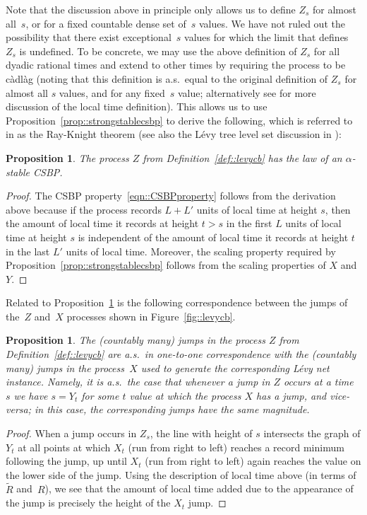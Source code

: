 \documentclass[10pt]{amsart}
\theoremstyle{plain}
\numberwithin{theorem}{section}
\newtheorem{proposition}[theorem]{Proposition}
\theoremstyle{definition}
\newcommand{\cadlag}{càdlàg}
\let\wt\widetilde
\begin{document}
Note that the discussion above in principle only allows us to define $Z_s$ for almost all~$s$, or for a fixed countable dense set of~$s$ values. We have not ruled out the possibility that there exist exceptional~$s$ values for which the limit that defines $Z_s$ is undefined. To be concrete, we may use the above definition of $Z_s$ for all dyadic rational times and extend to other times by requiring the process to be {\cadlag} (noting that this definition is a.s.\ equal to the original definition of $Z_s$ for almost all $s$ values, and for any fixed~$s$ value; alternatively see \cite{duquesnelegall2005levytrees} for more discussion of the local time definition). This allows us to use Proposition~\ref{prop::strongstablecsbp} to derive the following, which is referred to in \cite[Th.\,1.4.1]{duquesnelegall2005levytrees} as the Ray-Knight theorem (see also the Lévy tree level set discussion in \cite{dlg2002trees_levy, duquesnelegall2005levytrees}):

\begin{proposition}
\label{prop::Zisalphastable}
The process $Z$ from Definition~\ref{def::levycb} has the law of an $\alpha$-stable CSBP.
\end{proposition}
\begin{proof}
The CSBP property~\eqref{eqn::CSBPproperty} follows from the derivation above because if the process records $L+L'$ units of local time at height $s$, then the amount of local time it records at height $t > s$ in the first $L$ units of local time at height $s$ is independent of the amount of local time it records at height $t$ in the last $L'$ units of local time. Moreover, the scaling property required by Proposition~\ref{prop::strongstablecsbp} follows from the scaling properties of $X$ and $Y$.
\end{proof}

Related to Proposition~\ref{prop::Zisalphastable} is the following correspondence between the jumps of the~$Z$ and~$X$ processes shown in Figure~\ref{fig::levycb}.

\begin{proposition}
\label{prop::jump_correspondence}
The (countably many) jumps in the process $Z$ from Definition~\ref{def::levycb} are a.s.\ in one-to-one correspondence with the (countably many) jumps in the process~$X$ used to generate the corresponding Lévy net instance. Namely, it is a.s.\ the case that whenever a jump in $Z$ occurs at a time $s$ we have $s = Y_t$ for some $t$ value at which the process $X$ has a jump, and vice-versa; in this case, the corresponding jumps have the same magnitude.
\end{proposition}
\begin{proof}
When a jump occurs in $Z_s$, the line with height of $s$ intersects the graph of $Y_t$ at all points at which $X_t$ (run from right to left) reaches a record minimum following the jump, up until $X_t$ (run from right to left) again reaches the value on the lower side of the jump. Using the description of local time above (in terms of~$\wt R$ and~$R$), we see that the amount of local time added due to the appearance of the jump is precisely the height of the $X_t$ jump.
\end{proof}
\end{document}
